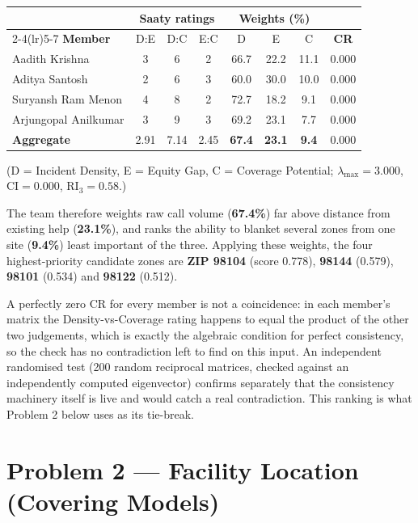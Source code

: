 \documentclass[11pt]{article}
\begin{document}
\begin{table}[h]
\centering
\small
\begin{tabular}{@{}lccccccc@{}}
\toprule
 & \multicolumn{3}{c}{\textbf{Saaty ratings}} & \multicolumn{3}{c}{\textbf{Weights (\%)}} & \\
\cmidrule(lr){2-4}\cmidrule(lr){5-7}
\textbf{Member} & D:E & D:C & E:C & D & E & C & \textbf{CR} \\
\midrule
Aadith Krishna       & 3    & 6    & 2    & 66.7 & 22.2 & 11.1 & 0.000 \\
Aditya Santosh       & 2    & 6    & 3    & 60.0 & 30.0 & 10.0 & 0.000 \\
Suryansh Ram Menon   & 4    & 8    & 2    & 72.7 & 18.2 &  9.1 & 0.000 \\
Arjungopal Anilkumar & 3    & 9    & 3    & 69.2 & 23.1 &  7.7 & 0.000 \\
\midrule
\textbf{Aggregate}   & 2.91 & 7.14 & 2.45 & \textbf{67.4} & \textbf{23.1} & \textbf{9.4} & 0.000 \\
\bottomrule
\end{tabular}
\end{table}
\noindent (D = Incident Density, E = Equity Gap, C = Coverage Potential;
$\lambda_{\max}=3.000$, $\mathrm{CI}=0.000$, $\mathrm{RI}_3=0.58$.)

The team therefore weights raw call volume (\textbf{67.4\%}) far above
distance from existing help (\textbf{23.1\%}), and ranks the ability to
blanket several zones from one site (\textbf{9.4\%}) least important of the
three. Applying these weights, the four highest-priority candidate zones are
\textbf{ZIP 98104} (score 0.778), \textbf{98144} (0.579), \textbf{98101}
(0.534) and \textbf{98122} (0.512).

A perfectly zero CR for every member is not a coincidence: in each member's
matrix the Density-vs-Coverage rating happens to equal the product of the
other two judgements, which is exactly the algebraic condition for perfect
consistency, so the check has no contradiction left to find on this input. An
independent randomised test (200 random reciprocal matrices, checked against
an independently computed eigenvector) confirms separately that the
consistency machinery itself is live and would catch a real contradiction.
This ranking is what Problem 2 below uses as its tie-break.

\section*{Problem 2 --- Facility Location (Covering Models)}
\end{document}
